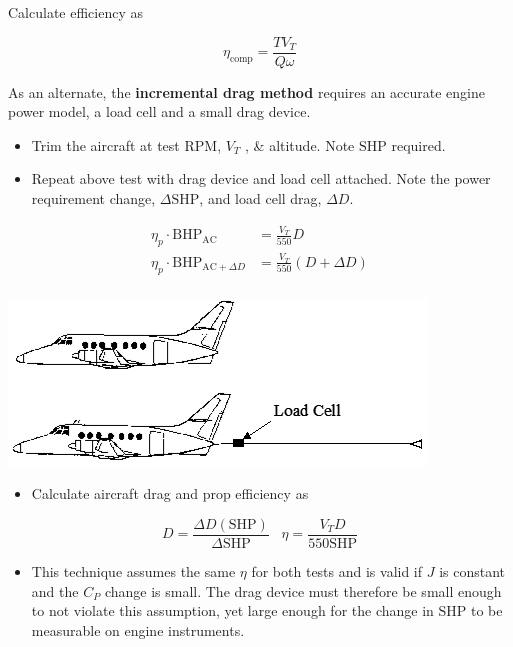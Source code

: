 \documentclass[
]{book}
\providecommand{\tightlist}{%
  \setlength{\itemsep}{0pt}\setlength{\parskip}{0pt}}
\begin{document}
Calculate efficiency as

\[
\eta_{\text{comp}} = \frac{T V_T}{Q \omega}
\]

As an alternate, the \textbf{incremental drag method} requires an accurate engine power model, a load cell and a small drag device.

\begin{itemize}
\tightlist
\item
  Trim the aircraft at test \(\text{RPM}\), \(V_T\) , \& altitude. Note \(\mathrm{SHP}\) required.
\item
  Repeat above test with drag device and load cell attached. Note the power requirement change, \(\Delta \mathrm{SHP}\), and load cell drag, \(\Delta D\).
\end{itemize}

\begin{align}
\eta_p \cdot \mathrm{BHP}_{\mathrm{AC}} &= \frac{V_T}{550}D \\
\eta_p \cdot \mathrm{BHP}_{\mathrm{AC} + \Delta D} &= \frac{V_T}{550} \left(D + \Delta D \right) \\
\end{align}

\includegraphics[width=4.37431in,height=1.75in]{media/11/image34.png}

\begin{itemize}
\tightlist
\item
  Calculate aircraft drag and prop efficiency as
\end{itemize}

\[
D = \frac{\Delta D \left( \mathrm{SHP} \right)}{\Delta  \mathrm{SHP} } \;\;\; \eta = \frac{V_T D}{550 \mathrm{SHP}} 
\]

\begin{itemize}
\tightlist
\item
  This technique assumes the same \(\eta\) for both tests and is valid if \(J\) is constant and the \(C_P\) change is small. The drag device must therefore be small enough to not violate this assumption, yet large enough for the change in \(\mathrm{SHP}\) to be measurable on engine instruments.
\end{itemize}
\end{document}
